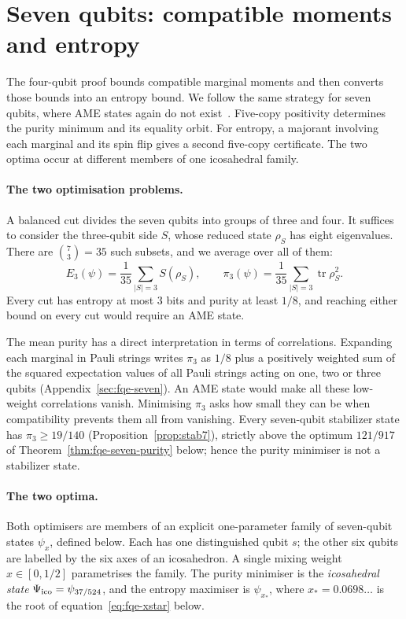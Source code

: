 \section{Seven qubits: compatible moments and entropy}\label{sec:fqe-seven-entropy}

The four-qubit proof bounds compatible marginal moments and then converts those bounds into an entropy bound.
We follow the same strategy for seven qubits, where AME states again do not exist~\cite{HGS}.
Five-copy positivity determines the purity minimum and its equality orbit. For entropy, a majorant involving
each marginal and its spin flip gives a second five-copy certificate. The two optima occur at different
members of one icosahedral family.

\paragraph{The two optimisation problems.} A balanced cut divides the seven qubits into groups of three and four.
It suffices to consider the three-qubit side $S$, whose reduced state $\rho_S$ has eight eigenvalues. There are
$\binom73=35$ such subsets, and we average over all of them:
\[
 E_3(\psi)=\frac1{35}\sum_{|S|=3}S(\rho_S),\qquad
 \pi_3(\psi)=\frac1{35}\sum_{|S|=3}\operatorname{tr}\rho_S^2 .
\]
Every cut has entropy at most $3$ bits and purity at least $1/8$, and reaching either bound on every cut
would require an AME state.

The mean purity has a direct interpretation in terms of correlations. Expanding each marginal in Pauli strings writes $\pi_3$ as $1/8$ plus a
positively weighted sum of the squared expectation values of all Pauli strings acting on one, two or three qubits
(Appendix~\ref{sec:fqe-seven}). An AME state would make all these low-weight correlations vanish. Minimising $\pi_3$
asks how small they can be when compatibility prevents them all from vanishing. Every seven-qubit stabilizer state has
$\pi_3\ge19/140$ (Proposition~\ref{prop:stab7}), strictly above the optimum $121/917$ of
Theorem~\ref{thm:fqe-seven-purity} below; hence the purity minimiser is not a stabilizer state.

\paragraph{The two optima.} Both optimisers are members of an explicit one-parameter family of seven-qubit states
$\psi_x$, defined below. Each has one distinguished qubit $s$; the other six qubits are labelled by the six axes of an
icosahedron. A single mixing weight $x\in[0,1/2]$ parametrises the family. The purity minimiser is the
\emph{icosahedral state} $\Psi_{\mathrm{ico}}=\psi_{37/524}$, and the entropy maximiser is $\psi_{x_*}$, where $x_*=0.0698\ldots$
is the root of equation~\eqref{eq:fqe-xstar} below.

